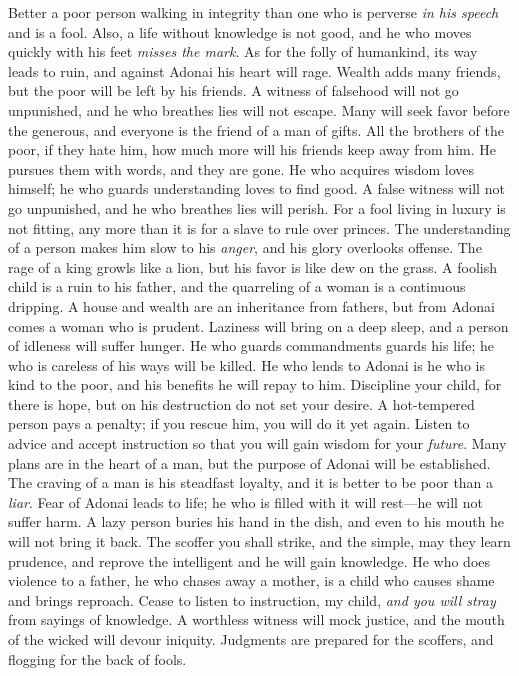 \begin{biblechapter} %
\verse Better a poor person walking in integrity 
than one who is perverse \textit{in his speech} and is a fool.
\verse Also, a life without knowledge is not good, 
and he who moves quickly with his feet \textit{misses the mark}.
\verse As for the folly of humankind, its way leads to ruin, 
and against Adonai his heart will rage.
\verse Wealth adds many friends, 
but the poor will be left by his friends.
\verse A witness of falsehood will not go unpunished, 
and he who breathes lies will not escape.
\verse Many will seek favor before the generous, 
and everyone is the friend of a man of gifts.
\verse All the brothers of the poor, if they hate him, 
how much more will his friends keep away from him. 
He pursues them with words, and they are gone.
\verse He who acquires wisdom loves himself; 
he who guards understanding loves to find good.
\verse A false witness will not go unpunished, 
and he who breathes lies will perish.
\verse For a fool living in luxury is not fitting, 
any more than it is for a slave to rule over princes.
\verse The understanding of a person makes him slow to his \textit{anger}, 
and his glory overlooks offense.
\verse The rage of a king growls like a lion, 
but his favor is like dew on the grass.
\verse A foolish child is a ruin to his father, 
and the quarreling of a woman is a continuous dripping.
\verse A house and wealth are an inheritance from fathers, 
but from Adonai comes a woman who is prudent.
\verse Laziness will bring on a deep sleep, 
and a person of idleness will suffer hunger.
\verse He who guards commandments guards his life; 
he who is careless of his ways will be killed.
\verse He who lends to Adonai is he who is kind to the poor, 
and his benefits he will repay to him.
\verse Discipline your child, for there is hope, 
but on his destruction do not set your desire.
\verse A hot-tempered person pays a penalty; 
if you rescue him, you will do it yet again.
\verse Listen to advice and accept instruction 
so that you will gain wisdom for your \textit{future}.
\verse Many plans are in the heart of a man, 
but the purpose of Adonai will be established.
\verse The craving of a man is his steadfast loyalty, 
and it is better to be poor than a \textit{liar}.
\verse Fear of Adonai leads to life; 
he who is filled with it will rest—he will not suffer harm.
\verse A lazy person buries his hand in the dish, 
and even to his mouth he will not bring it back.
\verse The scoffer you shall strike, and the simple, may they learn prudence, 
and reprove the intelligent and he will gain knowledge.
\verse He who does violence to a father, he who chases away a mother, 
is a child who causes shame and brings reproach.
\verse Cease to listen to instruction, my child, 
\textit{and you will stray} from sayings of knowledge.
\verse A worthless witness will mock justice, 
and the mouth of the wicked will devour iniquity.
\verse Judgments are prepared for the scoffers, 
and flogging for the back of fools.
\end{biblechapter}

